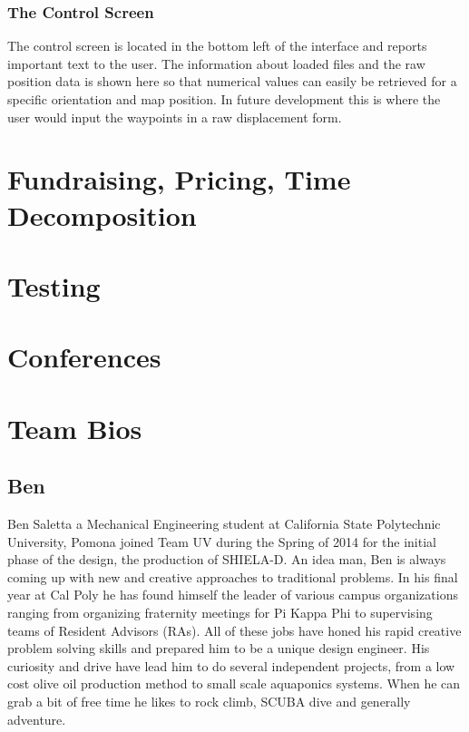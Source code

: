 \documentclass{report}
\begin{document}
\subsubsection{The Control Screen}
The control screen is located in the bottom left of the interface and reports important text to the user. The information about loaded files and the raw position data is shown here so that numerical values can easily be retrieved for a specific orientation and map position. In future development this is where the user would input the waypoints in a raw displacement form. 
\section{Fundraising, Pricing, Time Decomposition}
\section{Testing}
\section{Conferences}
\section{Team Bios}
\subsection{Ben}
Ben Saletta a Mechanical Engineering student at California State Polytechnic University, Pomona joined Team UV during the Spring of 2014 for the initial phase of the design, the production of SHIELA-D. An idea man, Ben is always coming up with new and creative approaches to  traditional problems.  In his final year at Cal Poly he has found himself the leader of various campus organizations ranging from organizing fraternity meetings for Pi Kappa Phi to supervising teams of Resident Advisors (RAs).  All of these jobs have honed his rapid creative problem solving skills and prepared him to be a unique design engineer.  His curiosity and drive have lead him to do several independent projects, from a low cost olive oil production method to small scale aquaponics systems.  When he can grab a bit of free time he likes to rock climb, SCUBA dive and generally adventure.
\end{document}
